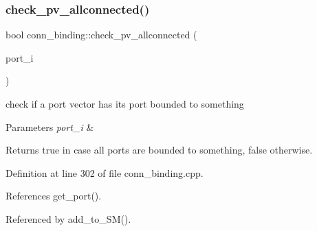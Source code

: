 \subsubsection{\texorpdfstring{check\+\_\+pv\+\_\+allconnected()}{check\_pv\_allconnected()}}
{\footnotesize\ttfamily bool conn\+\_\+binding\+::check\+\_\+pv\+\_\+allconnected (\begin{DoxyParamCaption}\item[{\hyperlink{structural__objects_8hpp_a8ea5f8cc50ab8f4c31e2751074ff60b2}{structural\+\_\+object\+Ref}}]{port\+\_\+i }\end{DoxyParamCaption})\hspace{0.3cm}{\ttfamily [protected]}}



check if a port vector has its port bounded to something 


\begin{DoxyParams}{Parameters}
{\em port\+\_\+i} & \\
\hline
\end{DoxyParams}
\begin{DoxyReturn}{Returns}
true in case all ports are bounded to something, false otherwise. 
\end{DoxyReturn}


Definition at line 302 of file conn\+\_\+binding.\+cpp.



References get\+\_\+port().



Referenced by add\+\_\+to\+\_\+\+S\+M().

